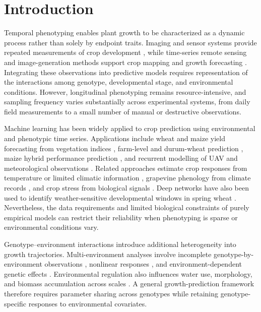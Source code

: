 \documentclass[preprint,12pt,authoryear]{elsarticle}
\begin{document}
\section{Introduction}
\label{sec:introduction}

Temporal phenotyping enables plant growth to be characterized as a dynamic process rather than solely by endpoint traits. Imaging and sensor systems provide repeated measurements of crop development \citep{zhang2020phenotyping,kim2023monitoring,ehret2011tomato}, while time-series remote sensing and image-generation methods support crop mapping and growth forecasting \citep{wang2021sentinel,drees2021brassica}. Integrating these observations into predictive models requires representation of the interactions among genotype, developmental stage, and environmental conditions. However, longitudinal phenotyping remains resource-intensive, and sampling frequency varies substantially across experimental systems, from daily field measurements to a small number of manual or destructive observations.

Machine learning has been widely applied to crop prediction using environmental and phenotypic time series. Applications include wheat and maize yield forecasting from vegetation indices \citep{nagy2018forecasting}, farm-level and durum-wheat prediction \citep{tesfaye2021wheat,chergui2022durum}, maize hybrid performance prediction \citep{sarijaloo2021corn}, and recurrent modelling of UAV and meteorological observations \citep{wang2025sugarbeet}. Related approaches estimate crop responses from temperature or limited climatic information \citep{sharma2022evapotranspiration,singh2023eto}, grapevine phenology from climate records \citep{fasihi2025phenology}, and crop stress from biological signals \citep{wen2025stress}. Deep networks have also been used to identify weather-sensitive developmental windows in spring wheat \citep{benke2025weather}. Nevertheless, the data requirements and limited biological constraints of purely empirical models can restrict their reliability when phenotyping is sparse or environmental conditions vary.

Genotype--environment interactions introduce additional heterogeneity into growth trajectories. Multi-environment analyses involve incomplete genotype-by-environment observations \citep{arciniegas2020imputation}, nonlinear responses \citep{patil2023genotype}, and environment-dependent genetic effects \citep{li2026plasticity}. Environmental regulation also influences water use, morphology, and biomass accumulation across scales \citep{gao2024ipecm,salagovic2025tomato,zhang2026lettuce}. A general growth-prediction framework therefore requires parameter sharing across genotypes while retaining genotype-specific responses to environmental covariates.
\end{document}
